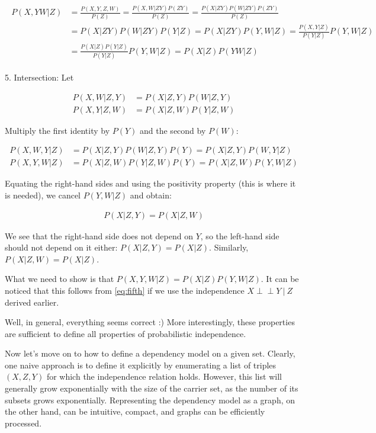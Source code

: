 \documentclass[fleqn]{article}
\newcommand{\independent}{\perp \!\!\! \perp}
\numberwithin{equation}{section}
\numberwithin{theorem}{section}
\numberwithin{figure}{section}
\numberwithin{lemma}{section}
\numberwithin{corollary}{section}
\begin{document}
\begin{align}
	\begin{split}
		P(X, YW|Z) &= \frac{P(X, Y, Z, W)}{P(Z)} = \frac{P(X, W|ZY)P(ZY)}{P(Z)} = \frac{P(X|ZY)P(W|ZY)P(ZY)}{P(Z)}\\
		&= P(X|ZY)P(W|ZY)P(Y|Z) = P(X|ZY)P(Y, W|Z) = \frac{P(X, Y|Z)}{P(Y|Z)}P(Y, W|Z) \\
		&= \frac{P(X|Z)P(Y|Z)}{P(Y|Z)}P(Y, W|Z) = P(X|Z)P(YW|Z)
	\end{split}
\end{align}

5. Intersection: Let

\begin{align}
	P(X, W|Z, Y) &= P(X|Z, Y)P(W|Z, Y)\\
	P(X, Y|Z, W) &= P(X|Z, W)P(Y|Z, W)
\end{align}

Multiply the first identity by \( P(Y) \) and the second by \( P(W) \):

\begin{align}
	P(X, W, Y|Z) &= P(X|Z, Y)P(W|Z, Y) P(Y) = P(X|Z, Y)P(W, Y|Z)\label{eq:fifth}\\
	P(X, Y, W|Z) &= P(X|Z, W)P(Y|Z, W) P(Y) = P(X|Z, W)P(Y, W|Z)
\end{align}

Equating the right-hand sides and using the positivity property (this is where it is needed), we cancel \( P(Y, W|Z) \) and obtain:

\begin{align}
	P(X|Z, Y) = P(X|Z, W)
\end{align}

We see that the right-hand side does not depend on \( Y \), so the left-hand side should not depend on it either: \( P(X|Z, Y) = P(X|Z) \). Similarly, \( P(X|Z, W) = P(X|Z) \).

What we need to show is that \( P(X, Y, W|Z) = P(X|Z)P(Y, W|Z) \). It can be noticed that this follows from \ref{eq:fifth} if we use the independence \( X \independent Y\ | \ Z \) derived earlier.

Well, in general, everything seems correct :) More interestingly, these properties are sufficient to define all properties of probabilistic independence.

Now let's move on to how to define a dependency model on a given set. Clearly, one naive approach is to define it explicitly by enumerating a list of triples \((X, Z, Y)\) for which the independence relation holds. However, this list will generally grow exponentially with the size of the carrier set, as the number of its subsets grows exponentially. Representing the dependency model as a graph, on the other hand, can be intuitive, compact, and graphs can be efficiently processed.
\end{document}
